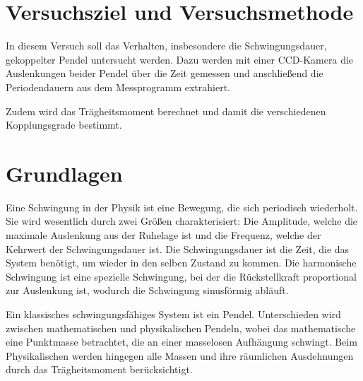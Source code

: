 \documentclass[
12pt,
a4paper,
bibliography=totocnumbered, %
BCOR=1cm, %
oneside, %
]{scrartcl}
\begin{document}
\thispagestyle{empty}



\thispagestyle{empty}

\tableofcontents

\clearpage %

\renewcommand{\thepage}{\arabic{page}}
\setcounter{page}{1}


\section[Versuchsziel]{Versuchsziel und Versuchsmethode}

In diesem Versuch soll das Verhalten, insbesondere die Schwingungsdauer, gekoppelter Pendel untersucht werden. Dazu werden mit einer CCD-Kamera die Auslenkungen beider Pendel über die Zeit gemessen und anschließend die Periodendauern aus dem Messprogramm extrahiert.

Zudem wird das Trägheitsmoment berechnet und damit die verschiedenen Kopplungsgrade bestimmt.

\section{Grundlagen}

Eine Schwingung in der Physik ist eine Bewegung, die sich periodisch wiederholt. Sie wird wesentlich durch zwei Größen charakterisiert: Die Amplitude, welche die maximale Auslenkung aus der Ruhelage ist und die Frequenz, welche der Kehrwert der Schwingungsdauer ist. Die Schwingungsdauer ist die Zeit, die das System benötigt, um wieder in den selben Zustand zu kommen. Die harmonische Schwingung ist eine spezielle Schwingung, bei der die Rückstellkraft proportional zur Auslenkung ist, wodurch die Schwingung sinusförmig abläuft.

Ein klassisches schwingungsfähiges  System ist ein Pendel. Unterschieden wird zwischen mathematischen und physikalischen Pendeln, wobei das mathematische eine Punktmasse betrachtet, die an einer masselosen Aufhängung schwingt. Beim Physikalischen werden hingegen alle Massen und ihre räumlichen Ausdehnungen durch das Trägheitsmoment berücksichtigt.
\end{document}
